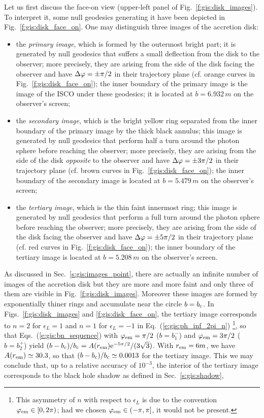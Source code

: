Let us first discuss the face-on view (upper-left panel of Fig.~\ref{f:gis:disk_images}).
To interpret it, some null geodesics generating it have been depicted
in Fig.~\ref{f:gis:disk_face_on}. One may distinguish three images of the accretion disk:
\begin{itemize}
\item the \emph{primary image}, which is formed by the outermost bright part; it is
generated by null geodesics that suffers a small deflection from the disk to
the observer; more precisely, they are arising from the side of the disk facing
the observer and have
$\Delta\varphi = \pm \pi/2$ in their trajectory plane (cf. orange curves in
Fig.~\ref{f:gis:disk_face_on}); the inner boundary of the
primary image is the image of the ISCO under these geodesics; it is located
at $b = 6.932\, m$ on the observer's screen;
\item the \emph{secondary image}, which is the bright yellow ring separated
from the inner boundary of the primary image by the thick black annulus; this
image is generated by null geodesics that perform half a turn around the
photon sphere before reaching the observer;  more precisely,
they are arising from the side of the disk \emph{opposite} to
the observer and have
$\Delta\varphi = \pm 3\pi/2$ in their trajectory plane (cf. brown curves in
Fig.~\ref{f:gis:disk_face_on}); the inner boundary of the secondary image
is located at $b = 5.479\, m$ on the observer's screen;
\item the \emph{tertiary image}, which is the thin faint innermost ring;
this image is generated by null geodesics that perform a full turn around
the photon sphere before reaching the observer; more precisely,
they are arising from the side of the disk facing
the observer and have
$\Delta\varphi = \pm 5\pi/2$ in their trajectory plane (cf. red curves in
Fig.~\ref{f:gis:disk_face_on}); the inner boundary of the tertiary image
is located at $b = 5.208\, m$ on the observer's screen.
\end{itemize}
As discussed in Sec.~\ref{s:gis:images_point}, there are actually an infinite
number of images of the accretion disk but they are more and more faint and
only three of them are visible in Fig.~\ref{f:gis:disk_images}. Moreover
these images are formed by exponentially thiner rings and accumulate near the circle $b = b_{\rm c}$. In Figs.~\ref{f:gis:disk_images} and \ref{f:gis:disk_face_on}, the tertiary image corresponds
to $n=2$ for $\epsilon_L = 1$ and $n=1$ for $\epsilon_L = -1$
in Eq.~(\ref{e:gis:ph_inf_2pi_n}) \footnote{This asymmetry of $n$ with respect to
$\epsilon_L$ is
due to the convention $\varphi_{\rm em}\in{[0,2\pi)}$;
had we chosen $\varphi_{\rm em}\in{(-\pi, \pi]}$, it would not be present.}, so that Eqs.~(\ref{e:gis:bn_sequence})
with $\varphi_{\rm em} = \pi/2$ ($b = b_1^-$) and $\varphi_{\rm em} = 3\pi/2$ ($b = b_2^+$)
yield $(b - b_{\rm c})/b_{\rm c} = A(r_{\rm em}) \mathrm{e}^{-5\pi/2}/(3\sqrt{3})$. With $r_{\rm em} = 6 m$,
we have $A(r_{\rm em}) \simeq 30.3$, so that $(b - b_{\rm c})/b_{\rm c} \simeq 0.0013$
for the tertiary image. This we may conclude that,  up to a relative accuracy of $10^{-3}$,
the interior of the tertiary image
corresponds to the black hole shadow as defined in Sec.~\ref{s:gis:shadow},

